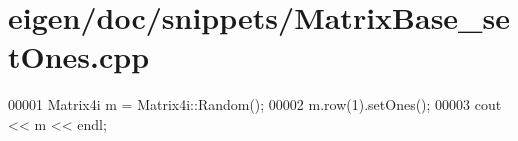 \hypertarget{eigen_2doc_2snippets_2_matrix_base__set_ones_8cpp_source}{}\section{eigen/doc/snippets/\+Matrix\+Base\+\_\+set\+Ones.cpp}
\label{eigen_2doc_2snippets_2_matrix_base__set_ones_8cpp_source}

\begin{DoxyCode}
00001 Matrix4i m = Matrix4i::Random();
00002 m.row(1).setOnes();
00003 cout << m << endl;
\end{DoxyCode}
